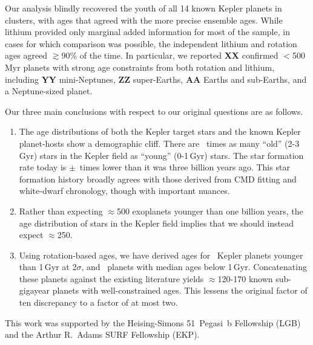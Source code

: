 \documentclass[11pt,twocolumn,tighten]{aastex63}
\begin{document}
Our analysis blindly recovered the youth of all 14 known Kepler planets in
clusters, with ages that agreed with the more precise ensemble ages.
While lithium provided only marginal added information for
most of the sample, in cases for which comparison was possible, the independent lithium and rotation ages agreed
$\gtrsim$90\% of the time.  In particular, we reported {\bf XX}
confirmed $<$500\,Myr planets with strong age constraints from both
rotation and lithium, including {\bf YY} mini-Neptunes, {\bf ZZ}
super-Earths, {\bf AA} Earths and sub-Earths, and a Neptune-sized
planet.

Our three main conclusions with respect to our original questions are
as follows.

\begin{enumerate}[leftmargin=*,topsep=0pt,itemsep=-1ex,partopsep=1ex,parsep=1ex]
  \item The age distributions of both the Kepler target stars and the
    known Kepler planet-hosts show a demographic cliff.  There are
    \ratioobtoybstars\ times as many ``old'' (2-3\,Gyr) stars in the
    Kepler field as ``young'' (0-1\,Gyr) stars.  The star formation
    rate today is \ratiosfr$\pm$\uncratiosfr\ times lower than it was
    three billion years ago.
    This star formation history broadly agrees with those derived
    from CMD fitting and white-dwarf chronology, though with
    important nuances.
  \item Rather than expecting $\approx$500 exoplanets younger than one
    billion years, the age distribution of stars in the
    Kepler field implies that we should instead expect $\approx$250.
  \item Using rotation-based ages, we have derived ages for
    \nplyounggyrotwosigma\ Kepler planets younger than 1\,Gyr at 2$\sigma$,
    and \nplyounggyro\ planets with median ages below 1\,Gyr.
    Concatenating these planets against the existing literature yields
    $\approx$120-170 known sub-gigayear planets with well-constrained
    ages.  This lessens the original factor of ten discrepancy to
    a factor of at most two.
\end{enumerate}


\acknowledgements
This work was supported by the Heising-Simons 51~Pegasi~b Fellowship
(LGB)
and the Arthur R.~Adams SURF Fellowship (EKP).

\end{document}
